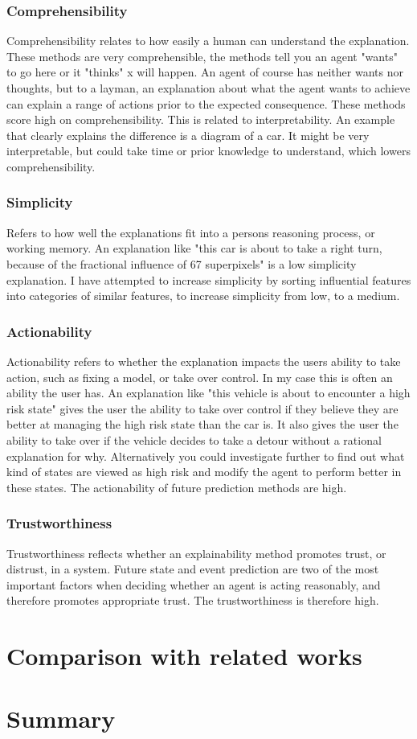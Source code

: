 \documentclass[UKenglish]{uiomasterthesis}
\begin{document}
\subsubsection{Comprehensibility}
Comprehensibility relates to how easily a human can understand the explanation. These methods are very comprehensible, the methods tell you an agent "wants" to go here or it "thinks" x will happen. An agent of course has neither wants nor thoughts, but to a layman, an explanation about what the agent wants to achieve can explain a range of actions prior to the expected consequence. These methods score high on comprehensibility. This is related to interpretability. An example that clearly explains the difference is a diagram of a car. It might be very interpretable, but could take time or prior knowledge to understand, which lowers comprehensibility.

\subsubsection{Simplicity}
Refers to how well the explanations fit into a persons reasoning process, or working memory. An explanation like "this car is about to take a right turn, because of the fractional influence of 67 superpixels" is a low simplicity explanation. I have attempted to increase simplicity by sorting influential features into categories of similar features, to increase simplicity from low, to a medium. 

\subsubsection{Actionability}
Actionability refers to whether the explanation impacts the users ability to take action, such as fixing a model, or take over control. In my case this is often an ability the user has. An explanation like "this vehicle is about to encounter a high risk state" gives the user the ability to take over control if they believe they are better at managing the high risk state than the car is. It also gives the user the ability to take over if the vehicle decides to take a detour without a rational explanation for why. Alternatively you could investigate further to find out what kind of states are viewed as high risk and modify the agent to perform better in these states. The actionability of future prediction methods are high.

\subsubsection{Trustworthiness}
Trustworthiness reflects whether an explainability method promotes trust, or distrust, in a system. Future state and event prediction are two of the most important factors when deciding whether an agent is acting reasonably, and therefore promotes appropriate trust. The trustworthiness is therefore high.

\section{Comparison with related works}

\section{Summary}


\printbibliography{}
\end{document}
